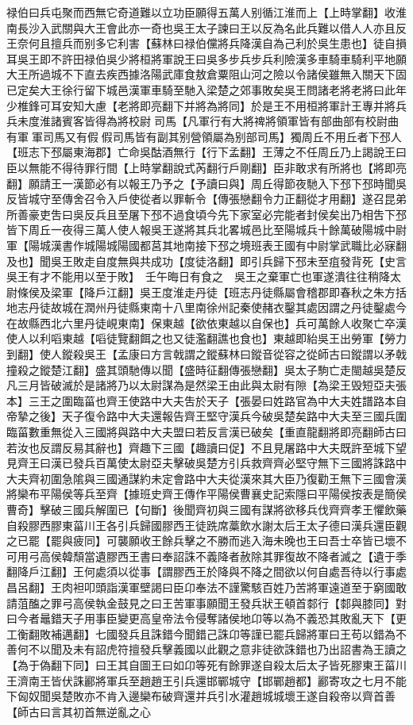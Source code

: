 禄伯曰兵屯聚而西無它奇道難以立功臣願得五萬人别循江淮而上【上時掌翻】收淮南長沙入武關與大王會此亦一奇也吳王太子諫曰王以反為名此兵難以借人人亦且反王奈何且擅兵而别多它利害【蘇林曰禄伯儻將兵降漢自為己利於吳生患也】徒自損耳吳王即不許田禄伯吳少將桓將軍說王曰吳多步兵步兵利險漢多車騎車騎利平地願大王所過城不下直去疾西據洛陽武庫食敖倉粟阻山河之險以令諸侯雖無入關天下固已定矣大王徐行留下城邑漢軍車騎至馳入梁楚之郊事敗矣吳王問諸老將老將曰此年少椎鋒可耳安知大慮【老將即亮翻下并將為將同】於是王不用桓將軍計王專并將兵兵未度淮諸賓客皆得為將校尉司馬【凡軍行有大將禆將領軍皆有部曲部有校尉曲有軍軍司馬又有假假司馬皆有副其别營領屬為别部司馬】獨周丘不用丘者下邳人【班志下邳屬東海郡】亡命吳酤酒無行【行下孟翻】王薄之不任周丘乃上謁說王曰臣以無能不得待罪行間【上時掌翻說式芮翻行戶剛翻】臣非敢求有所將也【將即亮翻】願請王一漢節必有以報王乃予之【予讀曰與】周丘得節夜馳入下邳下邳時聞吳反皆城守至傳舍召令入戶使從者以罪斬令【傳張戀翻令力正翻從才用翻】遂召昆弟所善豪吏吿曰吳反兵且至屠下邳不過食頃今先下家室必完能者封侯矣出乃相吿下邳皆下周丘一夜得三萬人使人報吳王遂將其兵北畧城邑比至陽城兵十餘萬破陽城中尉軍【陽城漢書作城陽城陽國都莒其地南接下邳之境班表王國有中尉掌武職比必寐翻及也】聞吳王敗走自度無與共成功【度徒洛翻】即引兵歸下邳未至疽發背死【史言吳王有才不能用以至于敗】　壬午晦日有食之　吳王之棄軍亡也軍遂潰往往稍降太尉條侯及梁軍【降戶江翻】吳王度淮走丹徒【班志丹徒縣屬會稽郡即春秋之朱方括地志丹徒故城在潤州丹徒縣東南十八里南徐州記秦使赭衣鑿其處因謂之丹徒鑿處今在故縣西北六里丹徒峴東南】保東越【欲依東越以自保也】兵可萬餘人收聚亡卒漢使人以利㗖東越【㗖徒覽翻餌之也又徒濫翻譙也食也】東越即紿吳王出勞軍【勞力到翻】使人鏦殺吳王【孟康曰方言戟謂之鏦蘇林曰鏦音從容之從師古曰鏦謂以矛戟撞殺之鏦楚江翻】盛其頭馳傳以聞【盛時征翻傳張戀翻】吳太子駒亡走閩越吳楚反凡三月皆破滅於是諸將乃以太尉謀為是然梁王由此與太尉有隙【為梁王毁短亞夫張本】三王之圍臨菑也齊王使路中大夫吿於天子【張晏曰姓路官為中大夫姓譜路本自帝摯之後】天子復令路中大夫還報告齊王堅守漢兵今破吳楚矣路中大夫至三國兵圍臨菑數重無從入三國將與路中大夫盟曰若反言漢已破矣【重直龍翻將即亮翻師古曰若汝也反謂反易其辭也】齊趣下三國【趣讀曰促】不且見屠路中大夫既許至城下望見齊王曰漢已發兵百萬使太尉亞夫擊破吳楚方引兵救齊齊必堅守無下三國將誅路中大夫齊初圍急隂與三國通謀約未定會路中大夫從漢來其大臣乃復勸王無下三國會漢將欒布平陽侯等兵至齊【據班史齊王傳作平陽侯曹襄史記索隱曰平陽侯按表是簡侯曹奇】擊破三國兵解圍已【句斷】後聞齊初與三國有謀將欲移兵伐齊齊孝王懼飲藥自殺膠西膠東菑川王各引兵歸國膠西王徒跣席藁飲水謝太后王太子德曰漢兵還臣觀之已罷【罷與疲同】可襲願收王餘兵擊之不勝而逃入海未晚也王曰吾士卒皆已壞不可用弓高侯韓頹當遺膠西王書曰奉詔誅不義降者赦除其罪復故不降者滅之【遺于季翻降戶江翻】王何處須以從事【謂膠西王於降與不降之間欲以何自處吾待以行事處昌呂翻】王肉袒叩頭詣漢軍壁謁曰臣卬奉法不謹驚駭百姓乃苦將軍遠道至于窮國敢請菹醢之罪弓高侯執金鼓見之曰王苦軍事願聞王發兵狀王頓首䣛行【䣛與膝同】對曰今者鼂錯天子用事臣變更高皇帝法令侵奪諸侯地卬等以為不義恐其敗亂天下【更工衡翻敗補邁翻】七國發兵且誅錯今聞錯己誅卬等謹已罷兵歸將軍曰王苟以錯為不善何不以聞及未有詔虎符擅發兵擊義國以此觀之意非徒欲誅錯也乃出詔書為王讀之【為于偽翻下同】曰王其自圖王曰如卬等死有餘罪遂自殺太后太子皆死膠東王菑川王濟南王皆伏誅酈將軍兵至趙趙王引兵還邯鄲城守【邯鄲趙都】酈寄攻之七月不能下匈奴聞吳楚敗亦不肯入邊欒布破齊還并兵引水灌趙城城壞王遂自殺帝以齊首善【師古曰言其初首無逆亂之心